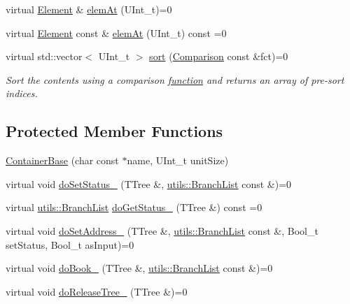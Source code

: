 \begin{DoxyCompactItemize}
\item 
virtual \hyperlink{classpanda_1_1Element}{Element} \& \hyperlink{classpanda_1_1ContainerBase_a486ab175342124d641c3ec47dea84a5e}{elemAt} (UInt\_\-t)=0
\item 
virtual \hyperlink{classpanda_1_1Element}{Element} const \& \hyperlink{classpanda_1_1ContainerBase_af7ad04980a8ea457f100af2fef7a5dff}{elemAt} (UInt\_\-t) const =0
\item 
virtual std::vector$<$ UInt\_\-t $>$ \hyperlink{classpanda_1_1ContainerBase_adf2484bf371fe51dd852301defb81d97}{sort} (\hyperlink{classpanda_1_1ContainerBase_a5269fda4f420b52d6ed9c0dac548559e}{Comparison} const \&fct)=0
\begin{DoxyCompactList}\small\item\em Sort the contents using a comparison \hyperlink{namespacepanda_1_1function}{function} and returns an array of pre-\/sort indices. \item\end{DoxyCompactList}\end{DoxyCompactItemize}
\subsection*{Protected Member Functions}
\begin{DoxyCompactItemize}
\item 
\hyperlink{classpanda_1_1ContainerBase_a1a538f1858b53bbe6af3918c1c1e10ef}{ContainerBase} (char const $\ast$name, UInt\_\-t unitSize)
\item 
virtual void \hyperlink{classpanda_1_1ContainerBase_aaae758928771e25de7c62db2fc9de750}{doSetStatus\_\-} (TTree \&, \hyperlink{classpanda_1_1utils_1_1BranchList}{utils::BranchList} const \&)=0
\item 
virtual \hyperlink{classpanda_1_1utils_1_1BranchList}{utils::BranchList} \hyperlink{classpanda_1_1ContainerBase_a6aa05603a5aff914a56681ab70b01b4e}{doGetStatus\_\-} (TTree \&) const =0
\item 
virtual void \hyperlink{classpanda_1_1ContainerBase_a1f8b467981e2d6e55cf1b1e355e4eb93}{doSetAddress\_\-} (TTree \&, \hyperlink{classpanda_1_1utils_1_1BranchList}{utils::BranchList} const \&, Bool\_\-t setStatus, Bool\_\-t asInput)=0
\item 
virtual void \hyperlink{classpanda_1_1ContainerBase_acb14a3b21278b32716445c846017b664}{doBook\_\-} (TTree \&, \hyperlink{classpanda_1_1utils_1_1BranchList}{utils::BranchList} const \&)=0
\item 
virtual void \hyperlink{classpanda_1_1ContainerBase_af5628a554142af0fcbbec3f28edd1666}{doReleaseTree\_\-} (TTree \&)=0
\end{DoxyCompactItemize}


